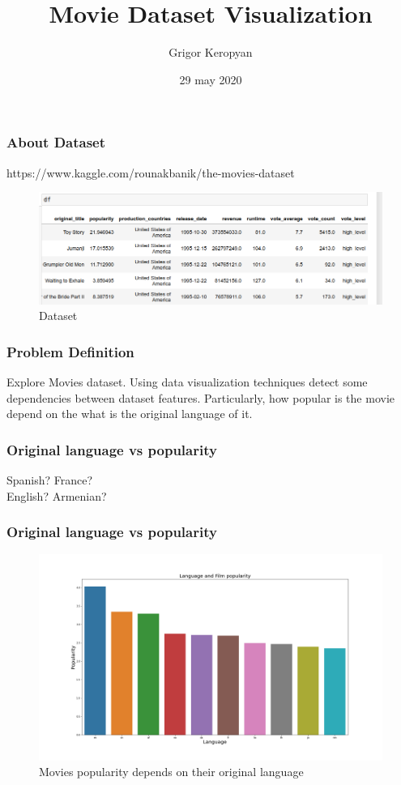 \documentclass{beamer}
\title{Movie Dataset Visualization}
\author[Grigor] %
{Grigor Keropyan\inst{1}}
\institute[YSU] %
{
	\inst{1}%
	Department of Mathematcis and Mechanics\\
	Yerevan State University
}
\date[2020] %
{29 may 2020}
\begin{document}
\frame{\titlepage}

\begin{frame}
\frametitle{About Dataset}

https://www.kaggle.com/rounakbanik/the-movies-dataset

\begin{figure}
	\centering
	\includegraphics[width=0.7\linewidth]{dataset}
	\caption{Dataset}
	\label{fig:dataset}
\end{figure}

\end{frame}

\begin{frame}
\frametitle{Problem Definition}

Explore Movies dataset. Using data visualization techniques detect some dependencies between dataset features. Particularly, how popular is the movie depend on the what is the original language of it.

\end{frame}

\begin{frame}
\frametitle{Original language vs popularity}

Spanish? \newline
France? \\
English? \hfill \break
Armenian?


\end{frame}


\begin{frame}
\frametitle{Original language vs popularity}

\begin{figure}
	\centering
	\includegraphics[width=1\linewidth]{language_film_pop}
	\caption{Movies popularity depends on their original language}
	\label{fig:pop_vs_language}
	
\end{figure}

\end{frame}
\end{document}
